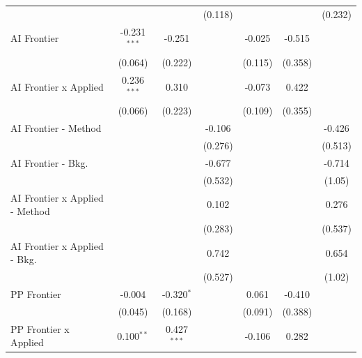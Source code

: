 \begin{tabular}{lcccccc}
                                  &                &                & (0.118)       &                &                & (0.232)\\   
   AI Frontier                    & -0.231$^{***}$ & -0.251         &               & -0.025         & -0.515         &   \\   
                                  & (0.064)        & (0.222)        &               & (0.115)        & (0.358)        &   \\   
   AI Frontier x Applied          & 0.236$^{***}$  & 0.310          &               & -0.073         & 0.422          &   \\   
                                  & (0.066)        & (0.223)        &               & (0.109)        & (0.355)        &   \\   
   AI Frontier - Method           &                &                & -0.106        &                &                & -0.426\\   
                                  &                &                & (0.276)       &                &                & (0.513)\\   
   AI Frontier - Bkg.             &                &                & -0.677        &                &                & -0.714\\   
                                  &                &                & (0.532)       &                &                & (1.05)\\   
   AI Frontier x Applied - Method &                &                & 0.102         &                &                & 0.276\\   
                                  &                &                & (0.283)       &                &                & (0.537)\\   
   AI Frontier x Applied - Bkg.   &                &                & 0.742         &                &                & 0.654\\   
                                  &                &                & (0.527)       &                &                & (1.02)\\   
   PP Frontier                    & -0.004         & -0.320$^{*}$   &               & 0.061          & -0.410         &   \\   
                                  & (0.045)        & (0.168)        &               & (0.091)        & (0.388)        &   \\   
   PP Frontier x Applied          & 0.100$^{**}$   & 0.427$^{***}$  &               & -0.106         & 0.282          &   \\   

\end{tabular}
